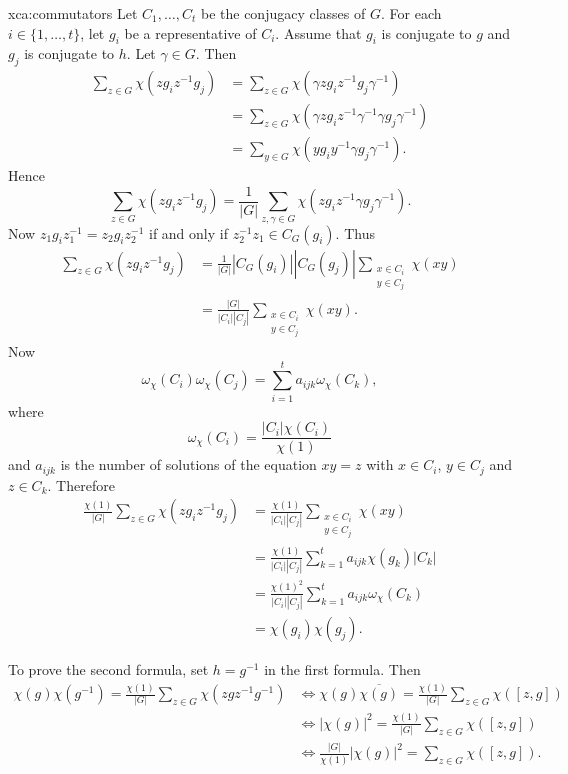 \begin{sol}{xca:commutators}
    Let $C_1,\dots,C_t$ be the conjugacy classes of $G$. For each
    $i\in\{1,\dots,t\}$, let $g_i$ be a representative of $C_i$. Assume
    that $g_i$ is conjugate to $g$ and 
    $g_j$ is conjugate to $h$. Let $\gamma\in G$.
    Then
    \begin{align*}
        \sum_{z\in G}\chi(zg_iz^{-1}g_j) 
        &= \sum_{z\in G}\chi(\gamma zg_iz^{-1}g_j\gamma^{-1})\\
        &= \sum_{z\in G}\chi(\gamma zg_iz^{-1}\gamma^{-1}\gamma g_j\gamma^{-1})\\
        &=\sum_{y\in G}\chi(yg_iy^{-1}\gamma g_j\gamma^{-1}).
    \end{align*}
    Hence
    \[
    \sum_{z\in G}\chi(zg_iz^{-1}g_j) 
    =\frac{1}{|G|}\sum_{z,\gamma\in G}\chi(zg_iz^{-1}\gamma g_j\gamma^{-1}).
    \]
    Now $z_1g_iz_1^{-1}=z_2g_iz_2^{-1}$ if and only 
    if $z_2^{-1}z_1\in C_G(g_i)$. Thus
    \begin{align*}
        \sum_{z\in G}\chi(zg_iz^{-1}g_j) &= \frac{1}{|G|}|C_G(g_i)||C_G(g_j)|\sum_{\substack{x\in C_i\\y\in C_j}}\chi(xy)\\
        &=\frac{|G|}{|C_i||C_j|}\sum_{\substack{x\in C_i\\y\in C_j}}\chi(xy).
    \end{align*}
    Now 
    \[
    \omega_{\chi}(C_i)\omega_{\chi}(C_j)=\sum_{i=1}^t a_{ijk}\omega_{\chi}(C_k),
    \]
    where 
    \[
    \omega_{\chi}(C_i)=\frac{|C_i|\chi(C_i)}{\chi(1)}
    \]
    and
    $a_{ijk}$ is the number of solutions of the equation
    $xy=z$ with $x\in C_i$, $y\in C_j$ and $z\in C_k$. Therefore
    \begin{align*}
        \frac{\chi(1)}{|G|}\sum_{z\in G}\chi(zg_iz^{-1}g_j)
        &=\frac{\chi(1)}{|C_i||C_j|}\sum_{\substack{x\in C_i\\y\in C_j}}\chi(xy)\\
        &=\frac{\chi(1)}{|C_i||C_j|}\sum_{k=1}^t a_{ijk}\chi(g_k)|C_k|\\
        &=\frac{\chi(1)^2}{|C_i||C_j|}\sum_{k=1}^t a_{ijk}\omega_{\chi}(C_k)\\
        &=\chi(g_i)\chi(g_j).
    \end{align*}
    
    To prove the second formula, 
    set $h=g^{-1}$ in the first formula.
    Then 
    \begin{align*}
        \chi(g)\chi(g^{-1})=\frac{\chi(1)}{|G|}\sum_{z\in G}\chi(zgz^{-1}g^{-1}) &\Longleftrightarrow
        \chi(g)\overline{\chi(g)}=\frac{\chi(1)}{|G|}\sum_{z\in G}\chi([z,g])\\
        & \Longleftrightarrow |\chi(g)|^2=\frac{\chi(1)}{|G|}\sum_{z\in G}\chi([z,g])\\
        & \Longleftrightarrow \frac{|G|}{\chi(1)}|\chi(g)|^2=\sum_{z\in G}\chi([z,g]).
    \end{align*}
\end{sol}


